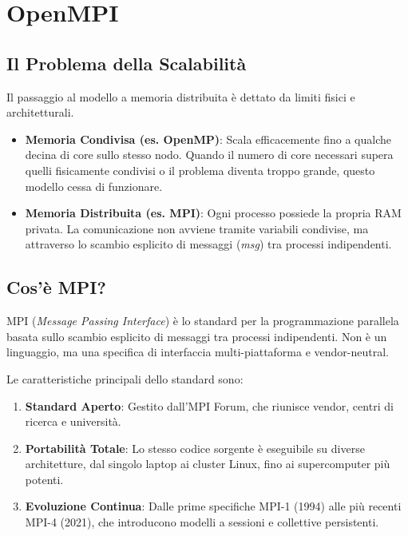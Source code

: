 \chapter{OpenMPI}

\section{Il Problema della Scalabilità}
Il passaggio al modello a memoria distribuita è dettato da limiti fisici e architetturali.
\begin{itemize}
    \item \textbf{Memoria Condivisa (es. OpenMP)}: Scala efficacemente fino a qualche decina di core sullo stesso nodo. Quando il numero di core necessari supera quelli fisicamente condivisi o il problema diventa troppo grande, questo modello cessa di funzionare.
    \item \textbf{Memoria Distribuita (es. MPI)}: Ogni processo possiede la propria RAM privata. La comunicazione non avviene tramite variabili condivise, ma attraverso lo scambio esplicito di messaggi (\textit{msg}) tra processi indipendenti.
\end{itemize}

\section{Cos'è MPI?}
MPI (\textit{Message Passing Interface}) è lo standard per la programmazione parallela basata sullo scambio esplicito di messaggi tra processi indipendenti. Non è un linguaggio, ma una specifica di interfaccia multi-piattaforma e vendor-neutral.

\vspace{0.5cm}
\noindent
Le caratteristiche principali dello standard sono:
\begin{enumerate}
    \item \textbf{Standard Aperto}: Gestito dall'MPI Forum, che riunisce vendor, centri di ricerca e università.
    \item \textbf{Portabilità Totale}: Lo stesso codice sorgente è eseguibile su diverse architetture, dal singolo laptop ai cluster Linux, fino ai supercomputer più potenti.
    \item \textbf{Evoluzione Continua}: Dalle prime specifiche MPI-1 (1994) alle più recenti MPI-4 (2021), che introducono modelli a sessioni e collettive persistenti.
\end{enumerate}


